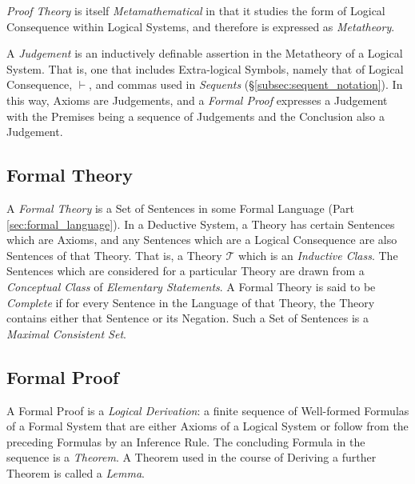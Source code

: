 \documentclass{article}
\begin{document}
\emph{Proof Theory} is itself \emph{Metamathematical} in that it
studies the form of Logical Consequence within Logical Systems, and
therefore is expressed as \emph{Metatheory}.

A \emph{Judgement} is an inductively definable assertion in the
Metatheory of a Logical System. That is, one that includes
Extra-logical Symbols, namely that of Logical Consequence, $\vdash$,
and commas used in \emph{Sequents}
(\S\ref{subsec:sequent_notation}). In this way, Axioms are Judgements,
and a \emph{Formal Proof} expresses a Judgement with the Premises
being a sequence of Judgements and the Conclusion also a Judgement.

\subsection{Formal Theory}\label{subsec:formal_theory}

A \emph{Formal Theory} is a Set of Sentences in some Formal Language
(Part \ref{sec:formal_language}). In a Deductive System, a Theory has
certain Sentences which are Axioms, and any Sentences which are a
Logical Consequence are also Sentences of that Theory. That is, a
Theory $\mathcal{T}$ which is an \emph{Inductive Class}. The Sentences
which are considered for a particular Theory are drawn from a
\emph{Conceptual Class} of \emph{Elementary Statements}. A Formal
Theory is said to be \emph{Complete} if for every Sentence in the
Language of that Theory, the Theory contains either that Sentence or
its Negation. Such a Set of Sentences is a \emph{Maximal Consistent
  Set}.

\subsection{Formal Proof} \label{subsec:formal_proof}

A Formal Proof is a \emph{Logical Derivation}: a finite sequence of
Well-formed Formulas of a Formal System that are either Axioms of a
Logical System or follow from the preceding Formulas by an Inference
Rule. The concluding Formula in the sequence is a \emph{Theorem}. A
Theorem used in the course of Deriving a further Theorem is called a
\emph{Lemma}.
\end{document}

